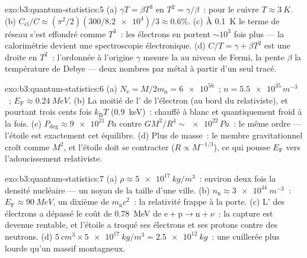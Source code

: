 \begin{solution}{exo:b3:quantum-statistics:5}
(a) $\gamma T = \beta T^3$ en $T^2 = \gamma/\beta$~: pour le cuivre
$T \approx \qty{3}{K}$. (b) $C_{\text{el}}/C \approx
(\pi^2/2)(300/\num{8.2e4})/3 \approx 0.6\%$. (c) À \qty{0.1}{K} le
terme de réseau s'est effondré comme $T^3$~: les électrons en
portent $\sim10^3$ fois plus --- la calorimétrie devient une
spectroscopie électronique. (d) $C/T = \gamma + \beta T^2$ est une
droite en $T^2$~: l'ordonnée à l'origine $\gamma$ mesure la  au niveau de Fermi, la pente $\beta$ la température de Debye
--- deux nombres par métal à partir d'un seul tracé.
\end{solution}

\begin{solution}{exo:b3:quantum-statistics:6}
(a) $N_{\text{e}} = M/2m_{\text{n}} = \num{6e56}$~; $n =
\num{5.5e35}\,\unit{m^{-3}}$~; $E_{\text{F}} \approx
\qty{0.24}{MeV}$. (b) La moitié de l' de l'électron
(au bord du relativiste), et pourtant trois cents fois
$k_{\text{B}}T$ (\qty{0.9}{keV})~: chauffé à blanc et quantiquement
froid à la fois. (c)
$P_{\text{deg}} \approx \qty{9e21}{Pa}$ contre $GM^2/R^4 \sim
\num{e22}\,\unit{Pa}$~: le même ordre --- l'étoile est exactement cet
équilibre. (d) Plus de masse~: le membre gravitationnel croît comme
$M^2$, et l'étoile doit se contracter ($R \propto M^{-1/3}$), ce qui
pousse $E_{\text{F}}$ vers l'adoucissement relativiste.
\end{solution}

\begin{solution}{exo:b3:quantum-statistics:7}
(a) $\rho \approx \qty{5e17}{kg/m^3}$~: environ deux fois la densité
nucléaire --- un noyau de la taille d'une ville. (b) $n_{\text{n}}
\approx \qty{3e44}{m^{-3}}$~: $E_{\text{F}} \approx \qty{90}{MeV}$,
un dixième de $m_{\text{n}}c^2$~: la relativité frappe à la porte.
(c) L' des électrons a dépassé le coût de
\qty{0.78}{MeV} de $\text{e} + \text{p} \to \text{n} + \nu$~: la
capture est devenue rentable, et l'étoile a troqué ses électrons et
ses protons contre des neutrons. (d) $\qty{5}{cm^3} \times \qty{5e17}{kg/m^3} =
\qty{2.5e12}{kg}$~: une cuillerée plus lourde qu'un massif
montagneux.
\end{solution}

